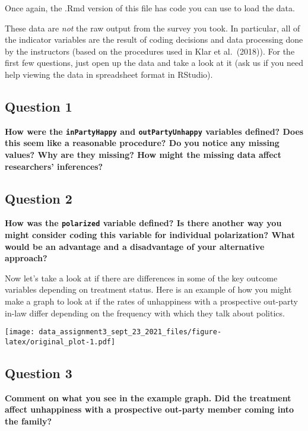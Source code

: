 \documentclass[
]{article}
\begin{document}
Once again, the .Rmd version of this file has code you can use to load
the data.

These data are \emph{not} the raw output from the survey you took. In
particular, all of the indicator variables are the result of coding
decisions and data processing done by the instructors (based on the
procedures used in Klar et al.~(2018)). For the first few questions,
just open up the data and take a look at it (ask us if you need help
viewing the data in spreadsheet format in RStudio).

\hypertarget{question-1}{%
\subsection{Question 1}\label{question-1}}

\textbf{How were the \texttt{inPartyHappy} and \texttt{outPartyUnhappy}
variables defined? Does this seem like a reasonable procedure? Do you
notice any missing values? Why are they missing? How might the missing
data affect researchers' inferences?}

\hypertarget{question-2}{%
\subsection{Question 2}\label{question-2}}

\textbf{How was the \texttt{polarized} variable defined? Is there
another way you might consider coding this variable for individual
polarization? What would be an advantage and a disadvantage of your
alternative approach?}

Now let's take a look at if there are differences in some of the key
outcome variables depending on treatment status. Here is an example of
how you might make a graph to look at if the rates of unhappiness with a
prospective out-party in-law differ depending on the frequency with
which they talk about politics.

\texttt{[image: data\_assignment3\_sept\_23\_2021\_files/figure-latex/original\_plot-1.pdf]}

\hypertarget{question-3}{%
\subsection{Question 3}\label{question-3}}

\textbf{Comment on what you see in the example graph. Did the treatment
affect unhappiness with a prospective out-party member coming into the
family?}
\end{document}
